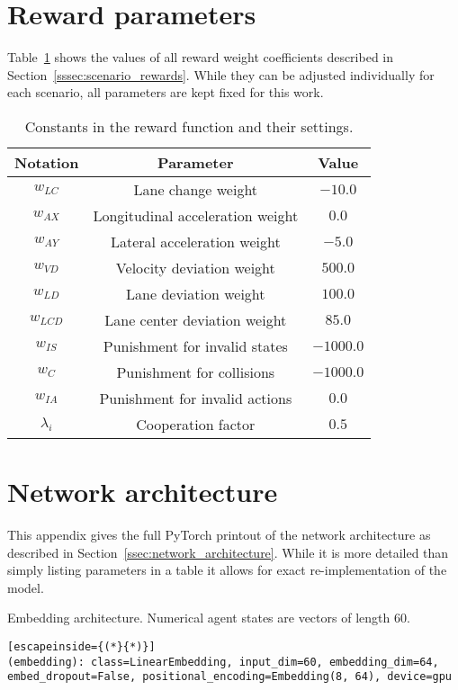 \section{Reward parameters}\label{app:reward_params}
Table~\ref{tab:reward_parameters} shows the values of all reward weight coefficients described in Section~\ref{sssec:scenario_rewards}. While they can be adjusted individually for each scenario, all parameters are kept fixed for this work.
\begin{table}[H]
    \centering
    \begin{tabular}{c c c}
    \toprule
    \textbf{Notation} & \textbf{Parameter} & \textbf{Value}\\
    \toprule
     $w_{LC}$ & Lane change weight & $-10.0$ \\
     $w_{AX}$ & Longitudinal acceleration weight & $0.0$ \\
     $w_{AY}$ & Lateral acceleration weight & $-5.0$ \\
     $w_{VD}$ & Velocity deviation weight & $500.0$ \\
     $w_{LD}$ & Lane deviation weight &  $100.0$\\
     $w_{LCD}$ & Lane center deviation weight & $85.0$ \\
     $w_{IS}$ & Punishment for invalid states & $-1000.0$ \\
     $w_{C}$ & Punishment for collisions & $-1000.0$ \\
     $w_{IA}$ & Punishment for invalid actions & $0.0$ \\
     $\lambda_i$ & Cooperation factor & $0.5$ \\
    \toprule
    \end{tabular}
    \caption[Reward function constants]{Constants in the reward function and their settings.}
    \label{tab:reward_parameters}
\end{table}


\section{Network architecture}\label{app:network_architecture}
This appendix gives the full PyTorch printout of the network architecture as described in Section~\ref{ssec:network_architecture}. While it is more detailed than simply listing parameters in a table it allows for exact re-implementation of the model.

Embedding architecture. Numerical agent states are vectors of length $60$.
\label{code:embedding}\begin{lstlisting}[escapeinside={(*}{*)}]
(embedding): class=LinearEmbedding, input_dim=60, embedding_dim=64,
embed_dropout=False, positional_encoding=Embedding(8, 64), device=gpu
\end{lstlisting}

